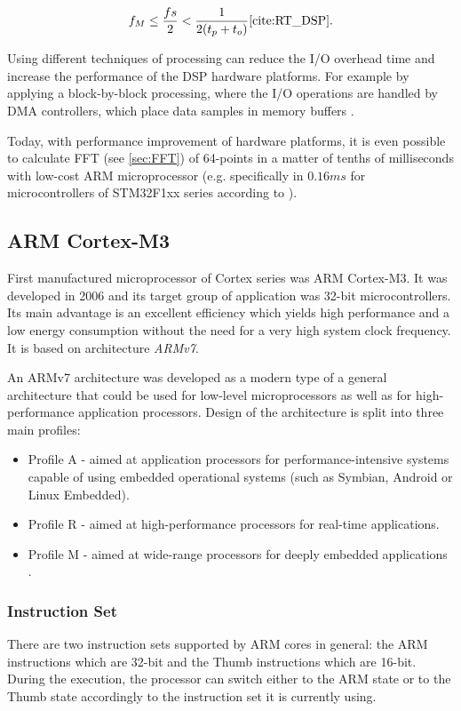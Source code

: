 \documentclass[twoside]{ctuthesis}
\theoremstyle{plain}
\theoremstyle{definition}
\theoremstyle{note}
\begin{document}
\begin{equation} \label{eq:hardRealTime2}
f_{M} \leq \frac{fs}{2} < \frac{1}{2(t_{p}+t_{o})} \cite{cite:RT_DSP}.
\end{equation}

Using different techniques of processing can reduce the I/O overhead time and increase the performance of the DSP hardware platforms. For example by applying a block-by-block processing, where the I/O operations are handled by DMA controllers, which place data samples in memory buffers \cite{cite:RT_DSP}.

Today, with performance improvement of hardware platforms, it is even possible to calculate FFT (see \ref{sec:FFT}) of 64-points in a matter of tenths of milliseconds with low-cost ARM microprocessor (e.g. specifically in $0.16 ms$ for microcontrollers of STM32F1xx series according to \cite{cite:STM32_DSP_library}).
\subsection{ARM Cortex-M3}
\label{sec:ARM_M3}
First manufactured microprocessor of Cortex series was ARM Cortex-M3. It was developed in 2006 and its target group of application was 32-bit microcontrollers. Its main advantage is an excellent efficiency which yields high performance and a low energy consumption without the need for a very high system clock frequency. It is based on architecture \textit{ARMv7}.

An ARMv7 architecture was developed as a modern type of a general architecture that could be used for low-level microprocessors as well as for high-performance application processors. Design of the architecture is split into three main profiles:
\begin{itemize}
	\setlength{\itemsep}{5pt}
	\item Profile A - aimed at application processors for performance-intensive systems capable of using embedded operational systems (such as Symbian, Android or Linux Embedded).
	\item Profile R - aimed at high-performance processors for real-time applications.
	\item Profile M - aimed at wide-range processors for deeply embedded applications \cite{cite:ARM-M3}.
\end{itemize}

\subsubsection{Instruction Set}
There are two instruction sets supported by ARM cores in general: the ARM instructions which are 32-bit and the Thumb instructions which are 16-bit. During the execution, the processor can switch either to the ARM state or to the Thumb state accordingly to the instruction set it is currently using.
\end{document}
